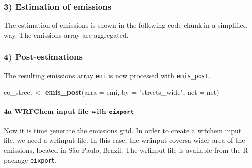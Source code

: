 \documentclass[12pt,graybox,envcountchap,sectrefs]{krantz}
\makeatletter
\newenvironment{Shaded}{\begin{snugshade}}{\end{snugshade}}
\newcommand{\KeywordTok}[1]{\textcolor[rgb]{0.13,0.29,0.53}{\textbf{#1}}}
\newcommand{\DataTypeTok}[1]{\textcolor[rgb]{0.13,0.29,0.53}{#1}}
\newcommand{\DecValTok}[1]{\textcolor[rgb]{0.00,0.00,0.81}{#1}}
\newcommand{\StringTok}[1]{\textcolor[rgb]{0.31,0.60,0.02}{#1}}
\newcommand{\OperatorTok}[1]{\textcolor[rgb]{0.81,0.36,0.00}{\textbf{#1}}}
\newcommand{\NormalTok}[1]{#1}
\let\oldparagraph\paragraph
\renewcommand{\paragraph}[1]{\oldparagraph{#1}\mbox{}}
\newenvironment{kframe}{%
\medskip{}
\setlength{\fboxsep}{.8em}
 \def\at@end@of@kframe{}%
 \ifinner\ifhmode%
  \def\at@end@of@kframe{\end{minipage}}%
  \begin{minipage}{\columnwidth}%
 \fi\fi%
 \def\FrameCommand##1{\hskip\@totalleftmargin \hskip-\fboxsep
 \colorbox{shadecolor}{##1}\hskip-\fboxsep
     \hskip-\linewidth \hskip-\@totalleftmargin \hskip\columnwidth}%
 \MakeFramed {\advance\hsize-\width
   \@totalleftmargin\z@ \linewidth\hsize
   \@setminipage}}%
 {\par\unskip\endMakeFramed%
 \at@end@of@kframe}
\renewenvironment{Shaded}{\begin{kframe}}{\end{kframe}}
\theoremstyle{definition}
\theoremstyle{definition}
\theoremstyle{definition}
\theoremstyle{remark}
\makeatother
\begin{document}
\subsubsection{3) Estimation of
emissions}\label{estimation-of-emissions}

The estimation of emissions is shown in the following code chunk in a
simplified way. The emissions array are aggregated.

\begin{Shaded}
\end{Shaded}

\subsubsection{4) Post-estimations}\label{post-estimations}

The resulting emissions array \texttt{emi} is now processed with
\texttt{emis\_post}.

\begin{Shaded}
\begin{Highlighting}[]
\NormalTok{co_street <-}\StringTok{ }\KeywordTok{emis_post}\NormalTok{(}\DataTypeTok{arra =}\NormalTok{ emi, }\DataTypeTok{by =} \StringTok{"streets_wide"}\NormalTok{, }\DataTypeTok{net =}\NormalTok{ net)}
\end{Highlighting}
\end{Shaded}

\paragraph{\texorpdfstring{4a WRFChem input file with
\texttt{eixport}}{4a WRFChem input file with eixport}}\label{a-wrfchem-input-file-with-eixport}

Now it is time generate the emissions grid. In order to create a wrfchem
input file, we need a wrfinput file. In this case, the wrfinput coversa
wider area of the emissions, located in São Paulo, Brazil. The wrfinput
file is available from the R package \texttt{eixport}.
\end{document}
